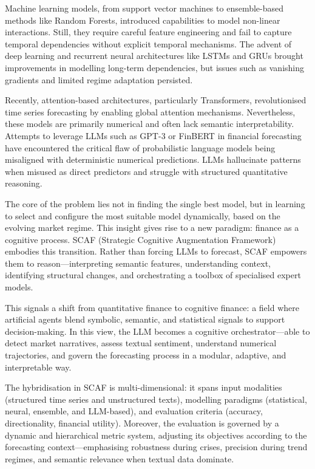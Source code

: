 \documentclass[conference]{IEEEtran}
\begin{document}
Machine learning models, from support vector machines to ensemble-based methods like Random Forests, introduced capabilities to model non-linear interactions. Still, they require careful feature engineering and fail to capture temporal dependencies without explicit temporal mechanisms. The advent of deep learning and recurrent neural architectures like LSTMs and GRUs brought improvements in modelling long-term dependencies, but issues such as vanishing gradients and limited regime adaptation persisted.

Recently, attention-based architectures, particularly Transformers, revolutionised time series forecasting by enabling global attention mechanisms. Nevertheless, these models are primarily numerical and often lack semantic interpretability. Attempts to leverage LLMs such as GPT-3 or FinBERT in financial forecasting have encountered the critical flaw of probabilistic language models being misaligned with deterministic numerical predictions. LLMs hallucinate patterns when misused as direct predictors and struggle with structured quantitative reasoning.

The core of the problem lies not in finding the single best model, but in learning to select and configure the most suitable model dynamically, based on the evolving market regime. This insight gives rise to a new paradigm: finance as a cognitive process. SCAF (Strategic Cognitive Augmentation Framework) embodies this transition. Rather than forcing LLMs to forecast, SCAF empowers them to reason—interpreting semantic features, understanding context, identifying structural changes, and orchestrating a toolbox of specialised expert models.

This signals a shift from quantitative finance to cognitive finance: a field where artificial agents blend symbolic, semantic, and statistical signals to support decision-making. In this view, the LLM becomes a cognitive orchestrator—able to detect market narratives, assess textual sentiment, understand numerical trajectories, and govern the forecasting process in a modular, adaptive, and interpretable way.

The hybridisation in SCAF is multi-dimensional: it spans input modalities (structured time series and unstructured texts), modelling paradigms (statistical, neural, ensemble, and LLM-based), and evaluation criteria (accuracy, directionality, financial utility). Moreover, the evaluation is governed by a dynamic and hierarchical metric system, adjusting its objectives according to the forecasting context—emphasising robustness during crises, precision during trend regimes, and semantic relevance when textual data dominate.
\end{document}

